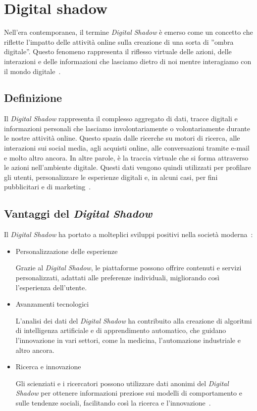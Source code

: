 \newpage

\section{Digital shadow}

Nell'era contemporanea, il termine \emph{Digital Shadow} è emerso come un concetto che riflette l'impatto delle attività online sulla creazione di una sorta di ”ombra digitale”. Questo fenomeno rappresenta il riflesso virtuale delle azioni, delle interazioni e delle informazioni che lasciamo dietro di noi mentre interagiamo con il mondo digitale~\cite{Shadow}.

\subsection{Definizione}

Il \emph{Digital Shadow} rappresenta il complesso aggregato di dati, tracce digitali e informazioni personali che lasciamo involontariamente o volontariamente durante le nostre attività online. Questo spazia dalle ricerche su motori di ricerca, alle interazioni sui social media, agli acquisti online, alle conversazioni tramite e-mail e molto altro ancora. In altre parole, è la traccia virtuale che si forma attraverso le azioni nell'ambiente digitale. Questi dati vengono quindi utilizzati per profilare gli utenti, personalizzare le esperienze digitali e, in alcuni casi, per fini pubblicitari e di marketing~\cite{Shadow}.

\subsection{Vantaggi del \emph{Digital Shadow}}

Il \emph{Digital Shadow} ha portato a molteplici sviluppi positivi nella società moderna~\cite{Shadow}:

\begin{itemize}
    \item Personalizzazione delle esperienze
    
    Grazie al \emph{Digital Shadow}, le piattaforme possono offrire contenuti e servizi personalizzati, adattati alle preferenze individuali, migliorando così l'esperienza dell'utente.

    \item Avanzamenti tecnologici
    
    L'analisi dei dati del \emph{Digital Shadow} ha contribuito alla creazione di algoritmi di intelligenza artificiale e di apprendimento automatico, che guidano l'innovazione in vari settori, come la medicina, l'automazione industriale e altro ancora.

    \item Ricerca e innovazione
    
    Gli scienziati e i ricercatori possono utilizzare dati anonimi del \emph{Digital Shadow} per ottenere informazioni preziose sui modelli di comportamento e sulle tendenze sociali, facilitando così la ricerca e l'innovazione~\cite{Shadow2}.
\end{itemize}

